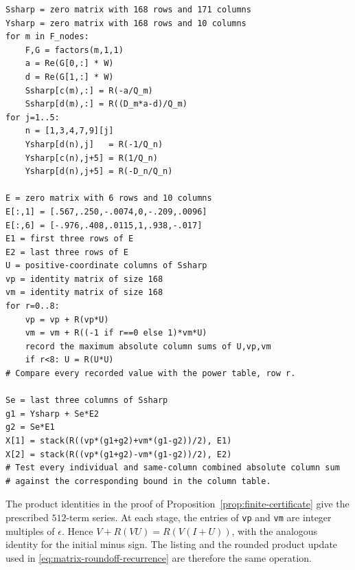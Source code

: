 \begin{lstlisting}[basicstyle=\ttfamily\footnotesize,columns=fullflexible,
breaklines=true,frame=single,caption={Floor-rounded verification: projected matrices and columns},label=alg:finite-columns]
Ssharp = zero matrix with 168 rows and 171 columns
Ysharp = zero matrix with 168 rows and 10 columns
for m in F_nodes:
    F,G = factors(m,1,1)
    a = Re(G[0,:] * W)
    d = Re(G[1,:] * W)
    Ssharp[c(m),:] = R(-a/Q_m)
    Ssharp[d(m),:] = R((D_m*a-d)/Q_m)
for j=1..5:
    n = [1,3,4,7,9][j]
    Ysharp[d(n),j]   = R(-1/Q_n)
    Ysharp[c(n),j+5] = R(1/Q_n)
    Ysharp[d(n),j+5] = R(-D_n/Q_n)

E = zero matrix with 6 rows and 10 columns
E[:,1] = [.567,.250,-.0074,0,-.209,.0096]
E[:,6] = [-.976,.408,.0115,1,.938,-.017]
E1 = first three rows of E
E2 = last three rows of E
U = positive-coordinate columns of Ssharp
vp = identity matrix of size 168
vm = identity matrix of size 168
for r=0..8:
    vp = vp + R(vp*U)
    vm = vm + R((-1 if r==0 else 1)*vm*U)
    record the maximum absolute column sums of U,vp,vm
    if r<8: U = R(U*U)
# Compare every recorded value with the power table, row r.

Se = last three columns of Ssharp
g1 = Ysharp + Se*E2
g2 = Se*E1
X[1] = stack(R((vp*(g1+g2)+vm*(g1-g2))/2), E1)
X[2] = stack(R((vp*(g1+g2)-vm*(g1-g2))/2), E2)
# Test every individual and same-column combined absolute column sum
# against the corresponding bound in the column table.
\end{lstlisting}

The product identities in the proof of
Proposition~\ref{prop:finite-certificate} give the prescribed $512$-term
series.  At each stage, the entries of \texttt{vp} and \texttt{vm} are
integer multiples of $\epsilon$.  Hence
$V+R(VU)=R(V(I+U))$, with the analogous identity for the initial minus
sign.  The listing and the rounded product update used in
\eqref{eq:matrix-roundoff-recurrence} are therefore the same operation.

